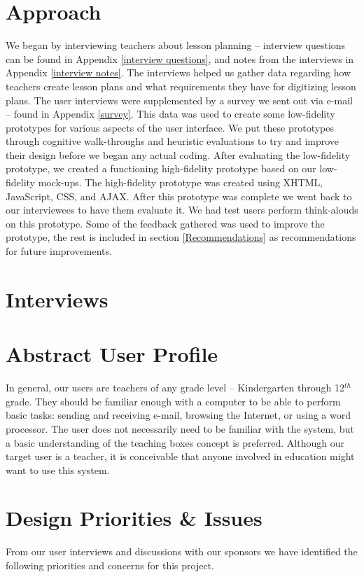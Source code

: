 \documentclass[10pt,letter]{article}
\begin{document}
\section{Approach}
We began by interviewing teachers about lesson planning -- interview questions
can be found in Appendix \ref{interview questions}, and notes from the
interviews in Appendix \ref{interview notes}. The interviews helped us gather
data regarding how teachers create lesson plans and what requirements they have
for digitizing lesson plans. The user interviews were supplemented by a survey
we sent out via e-mail -- found in Appendix \ref{survey}. This data was used to
create some low-fidelity prototypes for various aspects of the user interface.
We put these prototypes through cognitive walk-throughs and heuristic
evaluations to try and improve their design before we began any actual coding.
After evaluating the low-fidelity prototype, we created a functioning
high-fidelity prototype based on our low-fidelity mock-ups. The high-fidelity
prototype was created using XHTML, JavaScript, CSS, and AJAX. After this
prototype was complete we went back to our interviewees to have them evaluate
it. We had test users perform think-alouds on this prototype. Some of the
feedback gathered was used to improve the prototype, the rest is included in
section \ref{Recommendations} as recommendations for future improvements.

\section{Interviews}


\section{Abstract User Profile}
In general, our users are teachers of any grade level -- Kindergarten through
12$^{th}$ grade. They should be familiar enough with a computer to be able to
perform basic tasks: sending and receiving e-mail, browsing the Internet, or
using a word processor. The user does not necessarily need to be familiar with
the system, but a basic understanding of the teaching boxes concept is
preferred. Although our target user is a teacher, it is conceivable that anyone
involved in education might want to use this system.

\section{Design Priorities \& Issues}
From our user interviews and discussions with our sponsors we have identified
the following priorities and concerns for this project.
\end{document}

